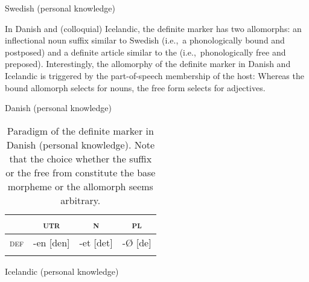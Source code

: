 {%
\begin{exe}
\ex \rm{Swedish (personal knowledge)}
\begin{xlist}
\end{xlist}
\end{exe}
In Danish and (colloquial) Icelandic, the definite marker has two allomorphs: an inflectional noun suffix similar to Swedish (i.e.,~a phonologically bound and postposed) and a definite article similar to the  (i.e.,~phonologically free and preposed). Interestingly, the allomorphy of the definite marker in Danish and Icelandic is triggered by the part-of-speech membership of the host: Whereas the bound allomorph selects for nouns, the free form selects for adjectives.
\begin{exe}
\ex \rm{Danish (personal knowledge)}
\begin{xlist}
\end{xlist}
\end{exe}
\begin{table}
\begin{tabular}{lccc}
\lsptoprule
			&\textsc{utr}	&\textsc{n}		&\textsc{pl}\\
\midrule
\textsc{def}	&-en [den]		&-et [det]			&-{Ø} [de]\\
\lspbottomrule
\end{tabular}
\caption[Paradigm of \textsc{def} in Danish]{Paradigm of the definite marker in Danish (personal knowledge). Note that the choice whether the suffix or the free from constitute the base morpheme or the allomorph seems arbitrary.}
\label{danish defallomorph}
\end{table}
\begin{exe}
\ex \rm{Icelandic (personal knowledge)}
\begin{xlist}
\end{xlist}
\end{exe}

}

